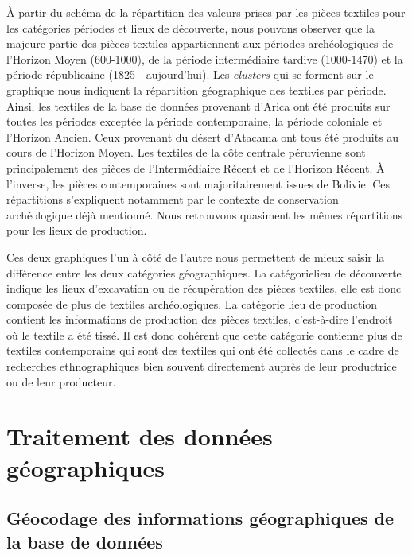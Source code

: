 À partir du schéma de la répartition des valeurs prises par les pièces textiles pour les catégories périodes et lieux de découverte, nous pouvons observer que la majeure partie des pièces textiles appartiennent aux périodes archéologiques de l'Horizon Moyen (600-1000), de la période intermédiaire tardive (1000-1470) et la période républicaine (1825 - aujourd'hui). Les \textit{clusters} qui se forment sur le graphique nous indiquent la répartition géographique des textiles par période. Ainsi, les textiles de la base de données provenant d'Arica ont été produits sur toutes les périodes exceptée la période contemporaine, la période coloniale et l'Horizon Ancien.
Ceux provenant du désert d'Atacama ont tous été produits au cours de l'Horizon Moyen. Les textiles de la côte centrale péruvienne sont principalement des pièces de l'Intermédiaire Récent et de l'Horizon Récent.
À l'inverse, les pièces contemporaines sont majoritairement issues de Bolivie. Ces répartitions s'expliquent notamment par le contexte de conservation archéologique déjà mentionné. Nous retrouvons quasiment les mêmes répartitions pour les lieux de production.

Ces deux graphiques l'un à côté de l'autre nous permettent de mieux saisir la différence entre les deux catégories géographiques. La catégorie\og lieu de découverte \fg \:indique les lieux d'excavation ou de récupération des pièces textiles, elle est donc composée de plus de textiles archéologiques.
La catégorie \og lieu de production \fg \:contient les informations de production des pièces textiles, c'est-à-dire l'endroit où le textile a été tissé. Il est donc cohérent que cette catégorie contienne plus de textiles contemporains qui sont des textiles qui ont été collectés dans le cadre de recherches ethnographiques bien souvent directement auprès de leur productrice ou de leur producteur.



\section{Traitement des données géographiques}
\subsection{Géocodage des informations géographiques de la base de données}

